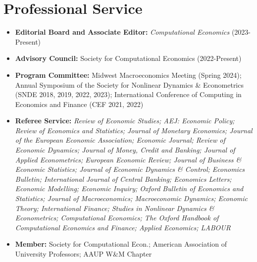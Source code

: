 \documentclass[10pt,letterpaper,en-US]{article}
\begin{document}
\section*{Professional Service}
\begin{itemize}
\item \textbf{Editorial Board and Associate Editor:} \emph{Computational Economics} (2023-Present)
\item \textbf{Advisory Council:} Society for Computational Economics (2022-Present)
\item \textbf{Program Committee:} Midwest Macroeconomics Meeting (Spring 2024); Annual Symposium of the Society for Nonlinear Dynamics \& Econometrics (SNDE 2018, 2019, 2022, 2023); International Conference of Computing in Economics and Finance (CEF 2021, 2022)
\item \textbf{Referee Service:} \emph{Review of Economic Studies; AEJ: Economic Policy; Review of Economics and Statistics; Journal of Monetary Economics; Journal of the European Economic Association; Economic Journal; Review of Economic Dynamics; Journal of Money, Credit and Banking; Journal of Applied Econometrics; European Economic Review; Journal of Business \& Economic Statistics; Journal of Economic Dynamics \& Control; Economics Bulletin; International Journal of Central Banking; Economics Letters; Economic Modelling; Economic Inquiry; Oxford Bulletin of Economics and Statistics; Journal of Macroeconomics; Macroeconomic Dynamics; Economic Theory; International Finance; Studies in Nonlinear Dynamics \& Econometrics; Computational Economics; The Oxford Handbook of Computational Economics and Finance; Applied Economics; LABOUR}
\item \textbf{Member:} Society for Computational Econ.; American Association of University Professors; AAUP W\&M Chapter
\end{itemize}
\end{document}
